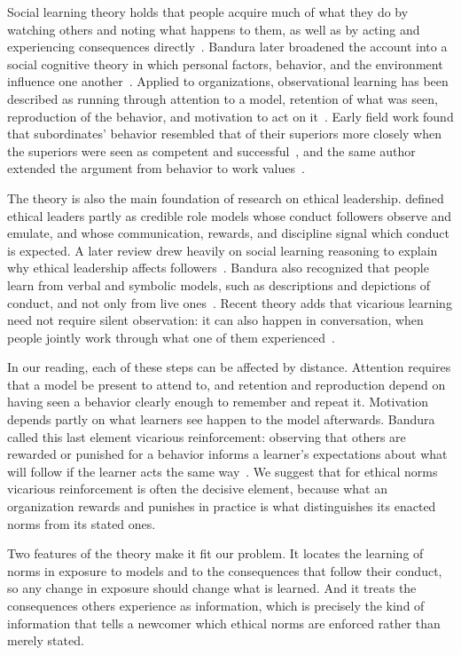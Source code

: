 \documentclass[12pt,a4paper]{article}
\theoremstyle{definition}
\begin{document}
Social learning theory holds that people acquire much of what they do by watching others and noting what happens to them, as well as by acting and experiencing consequences directly~\citep{bandura1977social}. Bandura later broadened the account into a social cognitive theory in which personal factors, behavior, and the environment influence one another~\citep{bandura1986social}. Applied to organizations, observational learning has been described as running through attention to a model, retention of what was seen, reproduction of the behavior, and motivation to act on it~\citep{manz1981vicarious}. Early field work found that subordinates' behavior resembled that of their superiors more closely when the superiors were seen as competent and successful~\citep{weiss1977subordinate}, and the same author extended the argument from behavior to work values~\citep{weiss1978social}.

The theory is also the main foundation of research on ethical leadership. \citet{brown2005ethical} defined ethical leaders partly as credible role models whose conduct followers observe and emulate, and whose communication, rewards, and discipline signal which conduct is expected. A later review drew heavily on social learning reasoning to explain why ethical leadership affects followers~\citep{brown2006ethical}. Bandura also recognized that people learn from verbal and symbolic models, such as descriptions and depictions of conduct, and not only from live ones~\citep{bandura1977social}. Recent theory adds that vicarious learning need not require silent observation: it can also happen in conversation, when people jointly work through what one of them experienced~\citep{myers2018coactive}.

In our reading, each of these steps can be affected by distance. Attention requires that a model be present to attend to, and retention and reproduction depend on having seen a behavior clearly enough to remember and repeat it. Motivation depends partly on what learners see happen to the model afterwards. Bandura called this last element vicarious reinforcement: observing that others are rewarded or punished for a behavior informs a learner's expectations about what will follow if the learner acts the same way~\citep{bandura1977social}. We suggest that for ethical norms vicarious reinforcement is often the decisive element, because what an organization rewards and punishes in practice is what distinguishes its enacted norms from its stated ones.

Two features of the theory make it fit our problem. It locates the learning of norms in exposure to models and to the consequences that follow their conduct, so any change in exposure should change what is learned. And it treats the consequences others experience as information, which is precisely the kind of information that tells a newcomer which ethical norms are enforced rather than merely stated.
\end{document}

